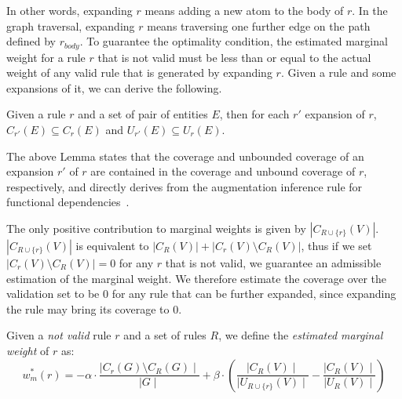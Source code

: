 In other words, expanding $r$ means adding a new atom to the body of $r$. In the graph traversal, expanding $r$ means traversing one further edge on the path defined by $r_{body}$. To guarantee the optimality condition, the estimated marginal weight for a rule $r$ that is not valid must be less than or equal to the actual weight of any valid rule that is generated by expanding $r$. Given a rule and some expansions of it, we can derive the following.

\begin{lemma} \label{lemma:krd_exp_cov}
	Given a rule $r$ and a set of pair of entities $E$, then for each $r'$ expansion of $r$, $C_{r'}(E) \subseteq C_r(E)$ and $U_{r'}(E) \subseteq U_r(E)$.
\end{lemma}
\vspace{0.5ex}

The above Lemma states that the coverage and unbounded coverage of an expansion $r'$ of $r$ are contained in the coverage and unbound coverage of $r$, respectively, and directly derives from the augmentation inference rule for functional dependencies~\cite{abiteboul1995foundations}. 

The only positive contribution to marginal weights is given by $|C_{R \cup \{r\}}(V)|$. $|C_{R \cup \{r\}}(V)|$ is equivalent to $|C_{R}(V)| + |C_r(V) \setminus C_R(V)|$, thus if we set $|C_r(V) \setminus C_R(V)|=0$ for any $r$ that is not valid, we guarantee an admissible estimation of the marginal weight. We therefore estimate the coverage over the validation set to be $0$ for any rule that can be further expanded, since expanding the rule may bring its coverage to $0$.

\begin{definition}\label{def:est_res_wei}
	Given a \emph{not valid} rule $r$ and a set of rules $R$, we define the \emph{estimated marginal weight} of $r$ as:
	\begin{equation*}
	w_m^*(r) = - \alpha \cdot \frac{\mid C_{r}(G) \setminus C_{R}(G) \mid}{\mid G \mid} + \beta \cdot (\frac{\mid C_R(V) \mid}{\mid U_{R \cup \{r\}}(V) \mid} - \frac{\mid C_{R}(V) \mid}{\mid U_{R}(V) \mid})
	\end{equation*}
\end{definition}

